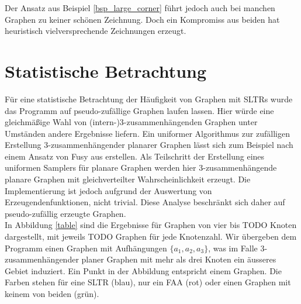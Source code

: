 Der Ansatz aus Beispiel \ref{bsp_large_corner} führt jedoch auch bei manchen Graphen zu keiner schönen Zeichnung. Doch ein Kompromiss aus beiden hat heuristisch vielversprechende Zeichnungen erzeugt.


\section{Statistische Betrachtung}

Für eine statistische Betrachtung der Häufigkeit von Graphen mit SLTRs wurde das Programm auf pseudo-zufällige Graphen laufen lassen. Hier würde eine gleichmäßige Wahl von (intern-)3-zusammenhängenden Graphen unter Umständen andere Ergebnisse liefern. Ein uniformer Algorithmus zur zufälligen Erstellung 3-zusammenhängender planarer Graphen lässt sich zum Beispiel nach einem Ansatz von Fusy aus \cite{fusy07} erstellen. Als Teilschritt der Erstellung eines uniformen Samplers für planare Graphen werden hier 3-zusammenhängende planare Graphen mit gleichverteilter Wahrscheinlichkeit erzeugt. Die Implementierung ist jedoch aufgrund der Auswertung von Erzeugendenfunktionen, nicht trivial. Diese Analyse beschränkt sich daher auf pseudo-zufällig erzeugte Graphen. \\

In Abbildung \ref{table} sind die Ergebnisse für Graphen von vier bis TODO Knoten dargestellt, mit jeweils TODO Graphen für jede Knotenzahl. Wir übergeben dem Programm einen Graphen mit Aufhängungen $\{a_1,a_2,a_3\}$, was im Falle 3-zusammenhängender planer Graphen mit mehr als drei Knoten ein äusseres Gebiet induziert. Ein Punkt in der Abbildung entspricht einem Graphen. Die Farben stehen für eine SLTR (blau), nur ein FAA (rot) oder einen Graphen mit keinem von beiden (grün). \\


